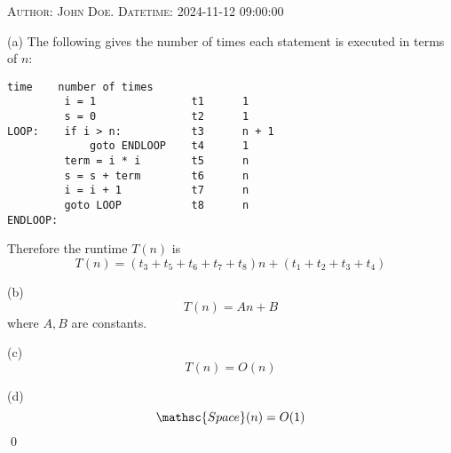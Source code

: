 
\textsc{Author: John Doe. Datetime: 2024-11-12 09:00:00}

(a) The following gives the number of times each statement is executed
in terms of $n$:
\begin{Verbatim}[frame=single, fontsize=\small]
                             time    number of times 
         i = 1               t1      1
         s = 0               t2      1
LOOP:    if i > n:           t3      n + 1
             goto ENDLOOP    t4      1
         term = i * i        t5      n
         s = s + term        t6      n
         i = i + 1           t7      n
         goto LOOP           t8      n
ENDLOOP:
\end{Verbatim}
Therefore the runtime $T(n)$ is
\[
T(n) = (t_3 + t_5 + t_6 + t_7 + t_8)n + (t_1 + t_2 + t_3 + t_4)
\]

(b)
\[
T(n) = An + B
\]
where $A, B$ are constants.

(c)
\[
T(n) = O(n)
\]

(d)
\[
\mathsc{Space}(n) = O(1)
\]
\qed
